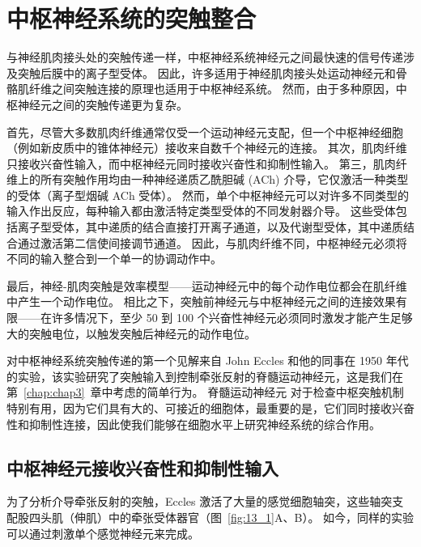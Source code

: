 \chapter{中枢神经系统的突触整合} \label{chap:chap13}

与神经肌肉接头处的突触传递一样，中枢神经系统神经元之间最快速的信号传递涉及突触后膜中的离子型受体。
因此，许多适用于神经肌肉接头处运动神经元和骨骼肌纤维之间突触连接的原理也适用于中枢神经系统。
然而，由于多种原因，中枢神经元之间的突触传递更为复杂。


首先，尽管大多数肌肉纤维通常仅受一个运动神经元支配，但一个中枢神经细胞（例如新皮质中的锥体神经元）接收来自数千个神经元的连接。
其次，肌肉纤维只接收兴奋性输入，而中枢神经元同时接收兴奋性和抑制性输入。
第三，肌肉纤维上的所有突触作用均由一种神经递质乙酰胆碱 (ACh) 介导，它仅激活一种类型的受体（离子型烟碱 ACh 受体）。
然而，单个中枢神经元可以对许多不同类型的输入作出反应，每种输入都由激活特定类型受体的不同发射器介导。 
这些受体包括离子型受体，其中递质的结合直接打开离子通道，以及代谢型受体，其中递质结合通过激活第二信使间接调节通道。
因此，与肌肉纤维不同，中枢神经元必须将不同的输入整合到一个单一的协调动作中。


最后，神经-肌肉突触是效率模型——运动神经元中的每个动作电位都会在肌纤维中产生一个动作电位。
相比之下，突触前神经元与中枢神经元之间的连接效果有限——在许多情况下，至少 50 到 100 个兴奋性神经元必须同时激发才能产生足够大的突触电位，以触发突触后神经元的动作电位。


对中枢神经系统突触传递的第一个见解来自 John Eccles 和他的同事在 1950 年代的实验，该实验研究了突触输入到控制牵张反射的脊髓运动神经元，这是我们在第~\ref{chap:chap3}~章中考虑的简单行为。
脊髓运动神经元 对于检查中枢突触机制特别有用，因为它们具有大的、可接近的细胞体，最重要的是，它们同时接收兴奋性和抑制性连接，因此使我们能够在细胞水平上研究神经系统的综合作用。



\section{中枢神经元接收兴奋性和抑制性输入}

为了分析介导牵张反射的突触，Eccles 激活了大量的感觉细胞轴突，这些轴突支配股四头肌（伸肌）中的牵张受体器官（图~\ref{fig:13_1}A、B）。 
如今，同样的实验可以通过刺激单个感觉神经元来完成。


